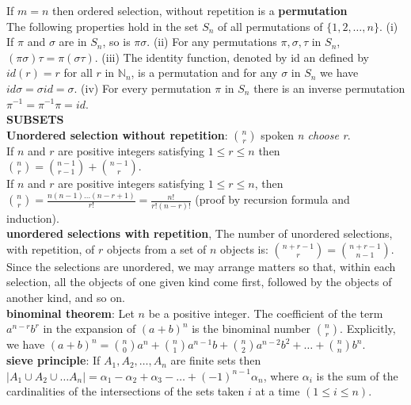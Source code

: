 \documentclass[10pt,landscape]{article}
\begin{document}
\begin{multicols}{4}
If $m=n$ then ordered selection, without repetition is a \textbf{permutation}\\

The following properties hold in the set $S_{n}$ of all permutations
of $\{1,2,\dots,n\}$. (i) If $\pi$ and $\sigma$ are in $S_{n}$, so is
$\pi\sigma$. (ii) For any permutations $\pi, \sigma, \tau$ in $S_{n}$,
$(\pi\sigma)\tau = \pi(\sigma\tau)$.
(iii) The identity function, denoted by id an defined by $id(r) = r$
for all $r$ in $\mathbb{N}_{n}$, is a permutation and for any $\sigma$
in $S_{n}$ we have $id \sigma = \sigma id = \sigma$.
(iv) For every permutation $\pi$ in $S_{n}$ there is an inverse
permutation $\pi^{-1} = \pi^{-1}\pi = id$.\\

\textbf{SUBSETS}\\
\textbf{Unordered selection without repetition}: $\binom{n}{r}$ spoken
\textit{n choose r}. \\

If $n$ and $r$ are positive integers satisfying $1 \leq r \leq n$ then
$\binom{n}{r} = \binom{n-1}{r-1} + \binom{n-1}{r}$.\\

If $n$ and $r$ are positive integers satisfying $1 \leq r \leq n$,
then $\binom{n}{r} =
\frac{n(n-1)\dots (n-r+1)}{r!}=\frac{n!}{r!(n-r)!}$ (proof by
recursion formula and induction).\\

\textbf{unordered selections with repetition}, The number of unordered
selections, with repetition, of $r$ objects from a set of $n$ objects
is: $\binom{n+r-1}{r} = \binom{n+r-1}{n-1}$. Since the selections are
unordered, we may arrange matters so that, within each selection, all
the objects of one given kind come first, followed by the objects of
another kind, and so on.\\

\textbf{binominal theorem}: Let $n$ be a positive integer. The
coefficient of the term $a^{n-r}b^{r}$ in the expansion of $(a +
b)^{n}$ is the binominal number $\binom{n}{r}$. Explicitly, we have 
$(a+b)^{n}=\binom{n}{0}a^{n}+ \binom{n}{1}a^{n-1}b+
\binom{n}{2}a^{n-2}b^{2}+\dots+\binom{n}{n}b^{n}$.\\

\textbf{sieve principle}: If $A_{1},A_{2},\dots,A_{n}$ are finite sets
then $|A_{1} \cup A_{2} \cup \dots A_{n}| =
\alpha_{1}-\alpha_{2}+\alpha_{3}-\dots+(-1)^{n-1}\alpha_{n}$, where 
$\alpha_{i}$ is the sum of the cardinalities of the intersections of
the sets taken $i$ at a time $(1 \leq i \leq n)$. \\ 


\end{multicols}
\end{document}
